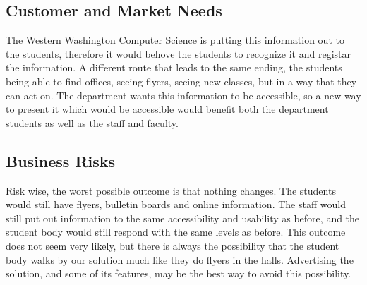 \subsection{Customer and Market Needs}
 The Western Washington Computer Science is putting this information out to the students, therefore it would behove the students to recognize it and registar the information.  A different route that leads to the same ending, the students being able to find offices, seeing flyers, seeing new classes, but in a way that they can act on.  The department wants this information to be accessible, so a new way to present it which would be accessible would benefit both the department students as well as the staff and faculty.


\subsection{Business Risks}
 Risk wise, the worst possible outcome is that nothing changes.  The students would still have flyers, bulletin boards and online information.  The staff would still put out information to the same accessibility and usability as before, and the student body would still respond with the same levels as before.  This outcome does not seem very likely, but there is always the possibility that the student body walks by our solution much like they do flyers in the halls.  Advertising the solution, and some of its features, may be the best way to avoid this possibility.
 

